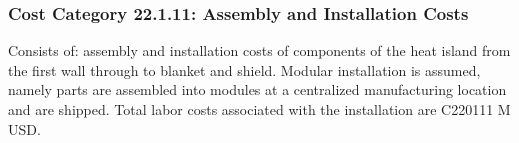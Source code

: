 
\subsubsection*{Cost Category 22.1.11: Assembly and Installation Costs}
Consists of: assembly and installation costs of components of the heat island from the first wall through to blanket and shield.
Modular installation is assumed, namely parts are assembled into modules at a centralized manufacturing location and are shipped.
Total labor costs associated with the installation are C220111 M USD.
